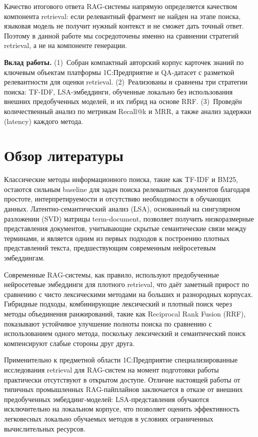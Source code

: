 \documentclass[nonacm, sigconf]{acmart}
\begin{document}
Качество итогового ответа RAG-системы напрямую определяется качеством компонента retrieval: если релевантный фрагмент не найден на этапе поиска, языковая модель не получит нужный контекст и не сможет дать точный ответ. Поэтому в данной работе мы сосредоточены именно на сравнении стратегий retrieval, а не на компоненте генерации.

\textbf{Вклад работы.} (1)~Собран компактный авторский корпус карточек знаний по ключевым объектам платформы 1С:Предприятие и QA-датасет с разметкой релевантности для оценки retrieval. (2)~Реализованы и сравнены три стратегии поиска: TF-IDF, LSA-эмбеддинги, обученные локально без использования внешних предобученных моделей, и их гибрид на основе RRF. (3)~Проведён количественный анализ по метрикам Recall@k и MRR, а также анализ задержки (latency) каждого метода.

\section{Обзор литературы}

Классические методы информационного поиска, такие как TF-IDF и BM25, остаются сильным baseline для задач поиска релевантных документов благодаря простоте, интерпретируемости и отсутствию необходимости в обучающих данных. Латентно-семантический анализ (LSA), основанный на сингулярном разложении (SVD) матрицы term-document, позволяет получить низкоразмерные представления документов, учитывающие скрытые семантические связи между терминами, и является одним из первых подходов к построению плотных представлений текста, предшествующим современным нейросетевым эмбеддингам.

Современные RAG-системы, как правило, используют предобученные нейросетевые эмбеддинги для плотного retrieval, что даёт заметный прирост по сравнению с чисто лексическими методами на больших и разнородных корпусах. Гибридные подходы, комбинирующие лексический и плотный поиск через методы объединения ранжирований, такие как Reciprocal Rank Fusion (RRF), показывают устойчивое улучшение полноты поиска по сравнению с использованием одного метода, поскольку лексический и семантический поиск компенсируют слабые стороны друг друга.

Применительно к предметной области 1С:Предприятие специализированные исследования retrieval для RAG-систем на момент подготовки работы практически отсутствуют в открытом доступе. Отличие настоящей работы от типичных промышленных RAG-пайплайнов заключается в отказе от внешних предобученных эмбеддинг-моделей: LSA-представления обучаются исключительно на локальном корпусе, что позволяет оценить эффективность легковесных локально обучаемых методов в условиях ограниченных вычислительных ресурсов.
\end{document}

